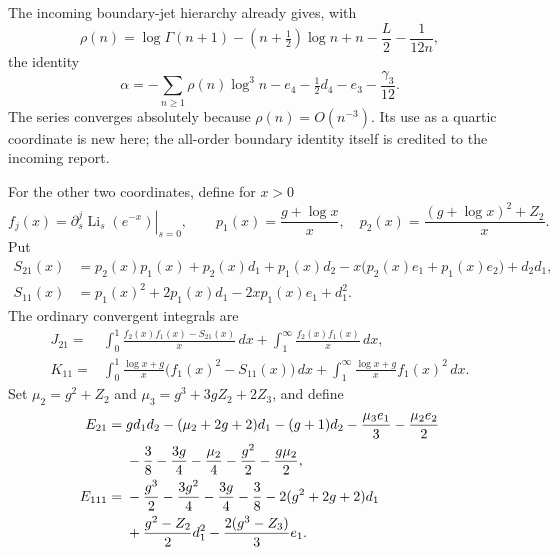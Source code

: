 The incoming boundary-jet hierarchy \cite{RepoIndependent} already gives, with
\[
 \rho(n)=\log\Gamma(n+1)-(n+\tfrac12)\log n+n-\frac L2-\frac1{12n},
\]
the identity
\begin{equation}\label{qt:alpha}
 \alpha=-\sum_{n\ge1}\rho(n)\log^3n-e_4-\tfrac12d_4-e_3-\frac{\gamma_3}{12}.
\end{equation}
The series converges absolutely because $\rho(n)=O(n^{-3})$.
Its use as a quartic coordinate is new here; the all-order boundary
identity itself is credited to the incoming report.

For the other two coordinates, define for $x>0$
\[
 f_j(x)=\left.\partial_s^j\operatorname{Li}_s(e^{-x})\right|_{s=0},
 \qquad
 p_1(x)=\frac{g+\log x}{x},\quad
 p_2(x)=\frac{(g+\log x)^2+Z_2}{x}.
\]
Put
\begin{align*}
 S_{21}(x)&=p_2(x)p_1(x)+p_2(x)d_1+p_1(x)d_2
                  -x\bigl(p_2(x)e_1+p_1(x)e_2\bigr)+d_2d_1,\\
 S_{11}(x)&=p_1(x)^2+2p_1(x)d_1-2xp_1(x)e_1+d_1^2.
\end{align*}
The ordinary convergent integrals are
\begin{align}\label{qt:J21}
 J_{21}={}&\int_0^1\frac{f_2(x)f_1(x)-S_{21}(x)}x\,dx
                  +\int_1^\infty\frac{f_2(x)f_1(x)}x\,dx,\\
 K_{11}={}&\int_0^1\frac{\log x+g}{x}
                    \bigl(f_1(x)^2-S_{11}(x)\bigr)\,dx
                  +\int_1^\infty\frac{\log x+g}{x}f_1(x)^2\,dx.
 \label{qt:K11}
\end{align}
Set $\mu_2=g^2+Z_2$ and $\mu_3=g^3+3gZ_2+2Z_3$, and define
\begin{align}\label{qt:constants}
 E_{21}={}&gd_1d_2-(\mu_2+2g+2)d_1-(g+1)d_2
                -\frac{\mu_3e_1}{3}-\frac{\mu_2e_2}{2}\notag\\
 &-\frac38-\frac{3g}{4}-\frac{\mu_2}{4}
                -\frac{g^2}{2}-\frac{g\mu_2}{2},\\
 E_{111}={}&-\frac{g^3}{2}-\frac{3g^2}{4}-\frac{3g}{4}-\frac38
               -2(g^2+2g+2)d_1\notag\\
 &+\frac{g^2-Z_2}{2}d_1^2-\frac{2(g^3-Z_3)}{3}e_1.
\end{align}

